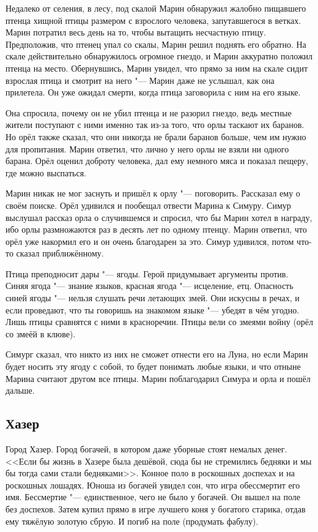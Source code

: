 Недалеко от селения, в лесу, под скалой Марин обнаружил жалобно пищавшего птенца хищной птицы размером с взрослого человека, запутавшегося в ветках.
Марин потратил весь день на то, чтобы вытащить несчастную птицу.
Предположив, что птенец упал со скалы, Марин решил поднять его обратно.
На скале действительно обнаружилось огромное гнездо, и Марин аккуратно положил птенца на место.
Обернувшись, Марин увидел, что прямо за ним на скале сидит взрослая птица и смотрит на него "--- Марин даже не услышал, как она прилетела.
Он уже ожидал смерти, когда птица заговорила с ним на его языке.

Она спросила, почему он не убил птенца и не разорил гнездо, ведь местные жители поступают с ними именно так из-за того, что орлы таскают их баранов.
Но орёл также сказал, что они никогда не брали баранов больше, чем им нужно для пропитания.
Марин ответил, что лично у него орлы не взяли ни одного барана.
Орёл оценил доброту человека, дал ему немного мяса и показал пещеру, где можно выспаться.

Марин никак не мог заснуть и пришёл к орлу "--- поговорить.
Рассказал ему о своём поиске.
Орёл удивился и пообещал отвести Марина к Симуру.
Симур выслушал рассказ орла о случившемся и спросил, что бы Марин хотел в награду, ибо орлы размножаются раз в десять лет по одному птенцу.
Марин ответил, что орёл уже накормил его и он очень благодарен за это.
Симур удивился, потом что-то сказал приближённому.

Птица преподносит дары "--- ягоды.
Герой придумывает аргументы против.
Синяя ягода "--- знание языков, красная ягода "--- исцеление, етц.
Опасность синей ягоды "--- нельзя слушать речи летающих змей.
Они искусны в речах, и если проведают, что ты говоришь на знакомом языке "--- убедят в чём угодно.
Лишь птицы сравнятся с ними в красноречии.
Птицы вели со змеями войну (орёл со змеёй в клюве).

Симург сказал, что никто из них не сможет отнести его на Луна, но если Марин будет носить эту ягоду с собой, то будет понимать любые языки, и что отныне Марина считают другом все птицы.
Марин поблагодарил Симура и орла и пошёл дальше.

\subsection{Хазер}

Город Хазер.
Город богачей, в котором даже уборные стоят немалых денег.
<<Если бы жизнь в Хазере была дешёвой, сюда бы не стремились бедняки и мы бы тогда сами стали бедняками>>.
Конное поло в роскошных доспехах и на роскошных лошадях.
Юноша из богачей увидел сон, что игра обессмертит его имя.
Бессмертие "--- единственное, чего не было у богачей.
Он вышел на поле без доспехов.
Затем купил прямо в игре лучшего коня у богатого старика, отдав ему тяжёлую золотую сбрую.
И погиб на поле (продумать фабулу).

